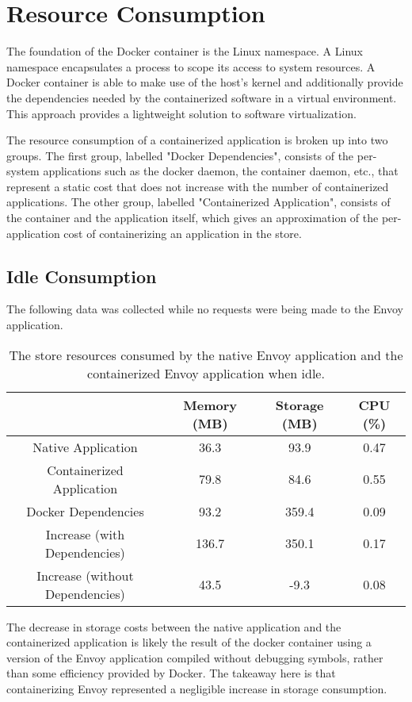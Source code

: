 \documentclass{article}
\begin{document}
\section{Resource Consumption}
The foundation of the Docker container is the Linux namespace. A Linux namespace encapsulates a process to scope its access to system resources. A Docker container is able to make use of the host's kernel and additionally provide the dependencies needed by the containerized software in a virtual environment. This approach provides a lightweight solution to software virtualization.

The resource consumption of a containerized application is broken up into two groups. The first group, labelled "Docker Dependencies", consists of the per-system applications such as the docker daemon, the container daemon, etc., that represent a static cost that does not increase with the number of containerized applications. The other group, labelled "Containerized Application", consists of the container and the application itself, which gives an approximation of the per-application cost of containerizing an application in the store.

\subsection{Idle Consumption}
The following data was collected while no requests were being made to the Envoy application.

\begin{table}[H]
\begin{tabular}{ |c|c|c|c| }
 \hline
   & Memory (MB) & Storage (MB) & CPU (\%) \\ 
 \hline
 Native Application & 36.3 & 93.9 & 0.47 \\
 \hline
 Containerized Application & 79.8 & 84.6 & 0.55 \\
 \hline
 Docker Dependencies & 93.2 & 359.4 & 0.09 \\
 \hline\hline
 Increase (with Dependencies) & 136.7 & 350.1 & 0.17 \\
 \hline
 Increase (without Dependencies) & 43.5 & -9.3 & 0.08 \\
 \hline
\end{tabular}
\caption{The store resources consumed by the native Envoy application and the containerized Envoy application when idle.}
\label{idle-consumption}
\end{table}

The decrease in storage costs between the native application and the containerized application is likely the result of the docker container using a version of the Envoy application compiled without debugging symbols, rather than some efficiency provided by Docker. The takeaway here is that containerizing Envoy represented a negligible increase in storage consumption.
\end{document}
